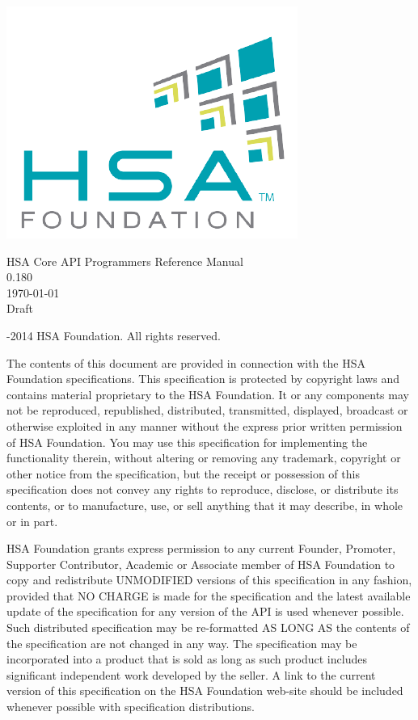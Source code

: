 \documentclass[draft]{book}
\newcommand{\docversion}{0.180}
\begin{document}
\hypersetup{pageanchor=false,citecolor=blue}
\begin{titlepage}
\includegraphics[width=.5\textwidth]{fig/foundation.png}
\vspace*{7cm}
\begin{center}
{\Large HSA Core API Programmers Reference Manual\\[1ex]\large\docversion}\\
\vspace*{1cm}
\vspace*{0.5cm}
{\small \today}\\
\vspace*{0.5cm}
{\small Draft}\\
\end{center}
\end{titlepage}
\thispagestyle{empty} {-2014 HSA Foundation. All rights
  reserved.}


The contents of this document are provided in connection with the HSA Foundation
specifications. This specification is protected by copyright laws and contains
material proprietary to the HSA Foundation. It or any components may not be
reproduced, republished, distributed, transmitted, displayed, broadcast or
otherwise exploited in any manner without the express prior written permission
of HSA Foundation. You may use this specification for implementing the
functionality therein, without altering or removing any trademark, copyright or
other notice from the specification, but the receipt or possession of this
specification does not convey any rights to reproduce, disclose, or distribute
its contents, or to manufacture, use, or sell anything that it may describe, in
whole or in part.

HSA Foundation grants express permission to any current Founder, Promoter,
Supporter Contributor, Academic or Associate member of HSA Foundation to copy
and redistribute UNMODIFIED versions of this specification in any fashion,
provided that NO CHARGE is made for the specification and the latest available
update of the specification for any version of the API is used whenever
possible. Such distributed specification may be re-formatted AS LONG AS the
contents of the specification are not changed in any way. The specification may
be incorporated into a product that is sold as long as such product includes
significant independent work developed by the seller. A link to the current
version of this specification on the HSA Foundation web-site should be included
whenever possible with specification distributions.
\end{document}
